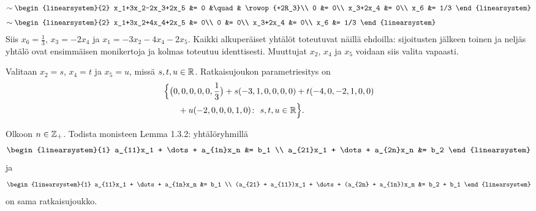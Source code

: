 \documentclass[11pt,a4paper]{amsart}
\begin{document}
\begin{solution}
\[\begin{aligned}
  \sim{}&
  \begin{linearsystem}{2}
    x_1+3x_2-2x_3+2x_5 &= 0 &\quad& \rowop{+2R_3}\\
    0 &= 0\\
    x_3+2x_4 &= 0\\
    x_6 &= 1/3
  \end{linearsystem}\\[1ex]
  \sim{}&
  \begin{linearsystem}{2}
    x_1+3x_2+4x_4+2x_5 &= 0\\
    0 &= 0\\
    x_3+2x_4 &= 0\\
    x_6 &= 1/3
  \end{linearsystem}
\end{aligned}
\]
Siis \(x_6=\frac13\), \(x_3=-2x_4\) ja
\(x_1=-3x_2-4x_4-2x_5\).
Kaikki alkuperäiset yhtälöt toteutuvat näillä ehdoilla: sijoitusten
jälkeen toinen ja neljäs yhtälö ovat ensimmäisen monikertoja ja
kolmas toteutuu identtisesti. Muuttujat \(x_2\), \(x_4\) ja \(x_5\)
voidaan siis valita vapaasti.

Valitaan \(x_2=s\), \(x_4=t\) ja \(x_5=u\), missä \(s,t,u\in\mathbb{R}\).
Ratkaisujoukon parametriesitys on
\[
\begin{aligned}
  \Bigl\{&
    \bigl(0,0,0,0,0,\frac13\bigr)
    +s
    (-3,1,0,0,0,0)
    +t
    (-4,0,-2,1,0,0)
    \\
    &\quad
    +u
    (-2,0,0,0,1,0)
    \colon\ s,t,u\in\mathbb{R}
  \Bigr\}.
\end{aligned}
\]
\end{solution}

\begin{exercise}
Olkoon \(n \in \mathbb{Z}_+\). Todista monisteen Lemma 1.3.2:
yhtälöryhmillä
\[
\begin{linearsystem}{1}
  a_{11}x_1 + \dots + a_{1n}x_n &= b_1 \\
  a_{21}x_1 + \dots + a_{2n}x_n &= b_2
\end{linearsystem}
\]
ja
\[
\begin{linearsystem}{1}
  a_{11}x_1 + \dots + a_{1n}x_n &= b_1 \\
  (a_{21} + a_{11})x_1 + \dots + (a_{2n} +
  a_{1n})x_n &= b_2 + b_1
\end{linearsystem}
\]
on sama ratkaisujoukko.
\end{exercise}
\end{document}
